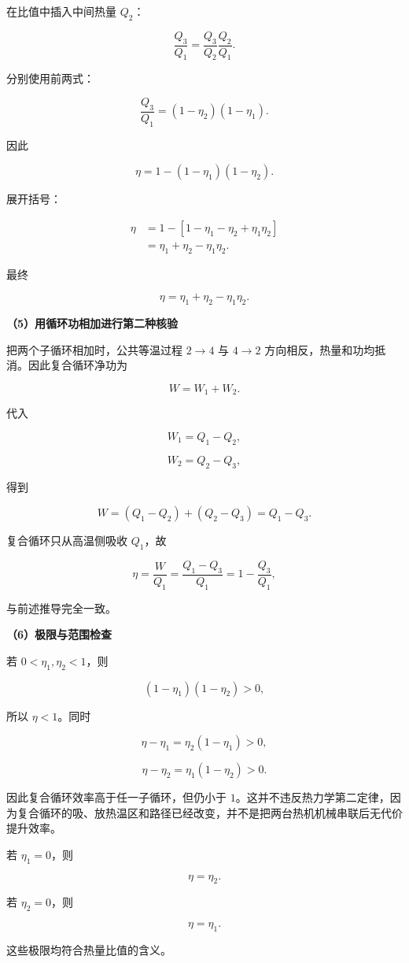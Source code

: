 \documentclass[12pt,a4paper,UTF8]{ctexart}
\begin{document}
在比值中插入中间热量 \(Q_2\)：

\[\frac{Q_3}{Q_1}
=\frac{Q_3}{Q_2}\frac{Q_2}{Q_1}.\]

分别使用前两式：

\[\frac{Q_3}{Q_1}
=(1-\eta_2)(1-\eta_1).\]

因此

\[\eta=1-(1-\eta_1)(1-\eta_2).\]

展开括号：

\[\begin{aligned}
\eta
&=1-[1-\eta_1-\eta_2+\eta_1\eta_2]\\
&=\eta_1+\eta_2-\eta_1\eta_2.
\end{aligned}\]

最终

\[\boxed{\eta=\eta_1+\eta_2-\eta_1\eta_2}.\]

\textbf{（5）用循环功相加进行第二种核验}

把两个子循环相加时，公共等温过程 \(2\to4\) 与 \(4\to2\)
方向相反，热量和功均抵消。因此复合循环净功为

\[W=W_1+W_2.\]

代入

\[W_1=Q_1-Q_2,\]

\[W_2=Q_2-Q_3,\]

得到

\[W=(Q_1-Q_2)+(Q_2-Q_3)=Q_1-Q_3.\]

复合循环只从高温侧吸收 \(Q_1\)，故

\[\eta=\frac W{Q_1}
=\frac{Q_1-Q_3}{Q_1}
=1-\frac{Q_3}{Q_1},\]

与前述推导完全一致。

\textbf{（6）极限与范围检查}

若 \(0<\eta_1,\eta_2<1\)，则

\[(1-\eta_1)(1-\eta_2)>0,\]

所以 \(\eta<1\)。同时

\[\eta-\eta_1=\eta_2(1-\eta_1)>0,\]

\[\eta-\eta_2=\eta_1(1-\eta_2)>0.\]

因此复合循环效率高于任一子循环，但仍小于
\(1\)。这并不违反热力学第二定律，因为复合循环的吸、放热温区和路径已经改变，并不是把两台热机机械串联后无代价提升效率。

若 \(\eta_1=0\)，则

\[\eta=\eta_2.\]

若 \(\eta_2=0\)，则

\[\eta=\eta_1.\]

这些极限均符合热量比值的含义。
\end{document}
